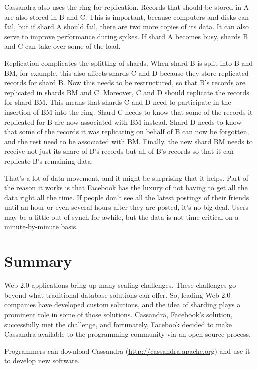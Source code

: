 Cassandra also uses the ring for replication.
Records that should be stored in A
are also stored in B and C.
This is important, because computers and disks can fail,
but if shard A should fail, there are two more copies of its data.
It can also serve to improve performance during spikes.
If shard A becomes busy, shards B and C can take over some of the load.

Replication complicates the splitting of shards.
When shard B is split into B and BM, for example, this also affects shards C and D
because they store replicated records for shard B.
Now this needs to be restructured, so that B's records are replicated in shards BM and C.
Moreover, C and D should replicate the records for shard BM.
This means that shards C and D need
to participate in the insertion of BM into the ring.
Shard C needs to know that some of the records
it replicated for B are now associated with BM instead.
Shard D needs to know that some of the records it was replicating
on behalf of B can now be forgotten, and the rest need to be associated with BM.
Finally, the new shard BM needs to receive not just its share
of B's records but all of B's records so that it can replicate B's remaining data.

That's a lot of data movement, and it might be surprising that it helps.
Part of the reason it works is that Facebook has the luxury of not having
to get all the data right all the time.
If people don't see all the latest postings of their friends until
an hour or even several hours after they are posted, it's no big deal.
Users may be a little out of synch for awhile, but the data is not time critical
on a minute-by-minute basis.

\section{Summary}

Web 2.0 applications bring up many scaling challenges.
These challenges go beyond what traditional database solutions can offer.
So, leading Web 2.0 companies have developed custom solutions,
and the idea of sharding plays a prominent role in some of those solutions.
Cassandra, Facebook's solution, successfully met the challenge, and
fortunately, Facebook decided to make Cassandra available to the
programming community via an open-source process.

Programmers can download Cassandra (\url{http://cassandra.apache.org})
and use it to develop new software.

